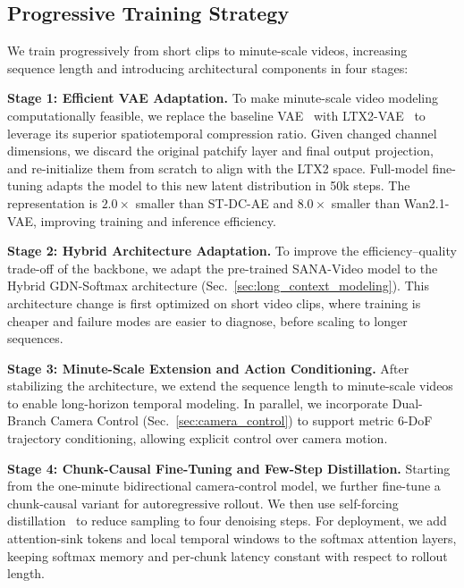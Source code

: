 \documentclass{llmxive}
\begin{document}
\subsection{Progressive Training Strategy}
\label{sec:training_strategy}

We train progressively from short clips to minute-scale videos, increasing sequence length and introducing architectural components in four stages:

\noindent\textbf{Stage 1: Efficient VAE Adaptation.}
To make minute-scale video modeling computationally feasible, we replace the baseline VAE~\citep{wan, dc-video-gen} with LTX2-VAE~\citep{ltx2} to leverage its superior spatiotemporal compression ratio. 
Given changed channel dimensions, we discard the original patchify layer and final output projection, and re-initialize them from scratch to align with the LTX2 space. 
Full-model fine-tuning adapts the model to this new latent distribution in 50k steps. 
The representation is $2.0\times$ smaller than ST-DC-AE and $8.0\times$ smaller than Wan2.1-VAE, improving training and inference efficiency.


\noindent\textbf{Stage 2: Hybrid Architecture Adaptation.} 
To improve the efficiency--quality trade-off of the backbone, we adapt the pre-trained SANA-Video model to the Hybrid GDN-Softmax architecture (Sec.~\ref{sec:long_context_modeling}). This architecture change is first optimized on short video clips, where training is cheaper and failure modes are easier to diagnose, before scaling to longer sequences.

\noindent\textbf{Stage 3: Minute-Scale Extension and Action Conditioning.} 
After stabilizing the architecture, we extend the sequence length to minute-scale videos to enable long-horizon temporal modeling. In parallel, we incorporate Dual-Branch Camera Control (Sec.~\ref{sec:camera_control}) to support metric 6-DoF trajectory conditioning, allowing explicit control over camera motion.

\noindent\textbf{Stage 4: Chunk-Causal Fine-Tuning and Few-Step Distillation.}
Starting from the one-minute bidirectional camera-control model, we further fine-tune a chunk-causal variant for autoregressive rollout.
We then use self-forcing distillation~\citep{huang2024selfforcing} to reduce sampling to four denoising steps.
For deployment, we add attention-sink tokens and local temporal windows to the softmax attention layers, keeping softmax memory and per-chunk latency constant with respect to rollout length.
\end{document}
